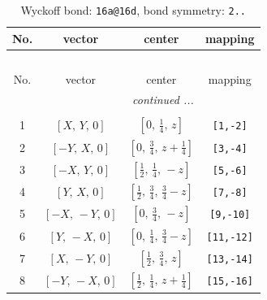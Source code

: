 \documentclass[fleqn,8pt]{jsarticle}
\begin{document}
\begin{longtable}{cccc}
\caption{Wyckoff bond: {\tt 16a@16d}, bond symmetry: {\tt 2..}}
 \\
 \hline \hline
No. & vector & center & mapping \\ \hline \endfirsthead

\multicolumn{3}{l}{\tablename\ \thetable{}} \\
 \hline \hline
No. & vector & center & mapping \\ \hline \endhead

 \hline \hline
\multicolumn{3}{r}{\footnotesize\it continued ...} \\ \endfoot

 \hline \hline
\multicolumn{3}{r}{} \\ \endlastfoot

1 & $\left[ X,\, Y,\, 0 \right]$ & $\left[ 0,\, \frac{1}{4},\, z \right]$ & {\tt [1,-2]} \\ \hline
2 & $\left[ - Y,\, X,\, 0 \right]$ & $\left[ 0,\, \frac{3}{4},\, z + \frac{1}{4} \right]$ & {\tt [3,-4]} \\ \hline
3 & $\left[ - X,\, Y,\, 0 \right]$ & $\left[ \frac{1}{2},\, \frac{1}{4},\, - z \right]$ & {\tt [5,-6]} \\ \hline
4 & $\left[ Y,\, X,\, 0 \right]$ & $\left[ \frac{1}{2},\, \frac{3}{4},\, \frac{3}{4} - z \right]$ & {\tt [7,-8]} \\ \hline
5 & $\left[ - X,\, - Y,\, 0 \right]$ & $\left[ 0,\, \frac{3}{4},\, - z \right]$ & {\tt [9,-10]} \\ \hline
6 & $\left[ Y,\, - X,\, 0 \right]$ & $\left[ 0,\, \frac{1}{4},\, \frac{3}{4} - z \right]$ & {\tt [11,-12]} \\ \hline
7 & $\left[ X,\, - Y,\, 0 \right]$ & $\left[ \frac{1}{2},\, \frac{3}{4},\, z \right]$ & {\tt [13,-14]} \\ \hline
8 & $\left[ - Y,\, - X,\, 0 \right]$ & $\left[ \frac{1}{2},\, \frac{1}{4},\, z + \frac{1}{4} \right]$ & {\tt [15,-16]} \\
\end{longtable}
\renewcommand{\arraystretch}{1.2}
\end{document}
